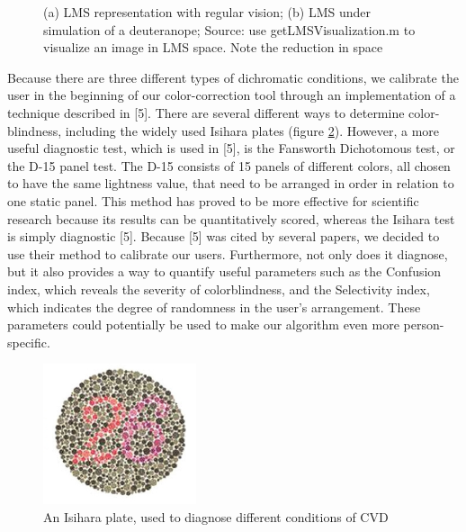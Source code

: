 \documentclass[10pt,twocolumn,letterpaper]{article}
\begin{document}
\begin{figure}[h]
\begin{subfigure}{0.22\textwidth}
    \caption{}
  \end{subfigure}
  \caption{(a) LMS representation with regular vision; (b) LMS under simulation of a deuteranope; Source: use getLMSVisualization.m to visualize an image in LMS space. Note the reduction in space}
  \label{fig:gamut}
\end{figure}

	Because there are three different types of dichromatic conditions, we calibrate the user in the beginning of our color-correction tool through an implementation of a technique described in [5]. There are several different ways to determine color-blindness, including the widely used Isihara plates (figure \ref{fig:plate}). However, a more useful diagnostic test, which is used in [5], is the Fansworth Dichotomous test, or the D-15 panel test. The D-15 consists of 15 panels of different colors, all chosen to have the same lightness value, that need to be arranged in order in relation to one static panel. This method has proved to be more effective for scientific research because its results can be quantitatively scored, whereas the Isihara test is simply diagnostic [5]. Because [5] was cited by several papers, we decided to use their method to calibrate our users. Furthermore, not only does it diagnose, but it also provides a way to quantify useful parameters such as the Confusion index, which reveals the severity of colorblindness, and the Selectivity index, which indicates the degree of randomness in the user’s arrangement. These parameters could potentially be used to make our algorithm even more person-specific. 

\begin{figure}[h]
  \centering
  \includegraphics[width=0.4\textwidth]{plate.png}
  \caption{An Isihara plate, used to diagnose different conditions of CVD}
  \label{fig:plate}
\end{figure}
\end{document}
